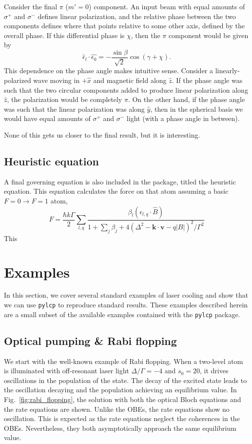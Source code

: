 \documentclass[final,5p,times,twocolumn]{elsarticle}
\begin{document}
Consider the final $\pi$ ($m'=0$) component.  An input beam with equal amounts
of $\sigma^+$ and $\sigma^-$  defines linear polarization, and the relative
phase between the two components defines where that points relative to some
other axis, defined by the overall  phase.  If this differential phase is
$\chi$, then the $\pi$ component would be given by
\begin{equation}
  \hat{\epsilon}_l\cdot\hat{\epsilon_0} = -\frac{\sin\beta}{\sqrt{2}}
  \cos(\gamma+\chi).
\end{equation}
This dependence on the phase angle makes intuitive sense.  Consider a
linearly-polarized wave moving in $+\hat{x}$ and magnetic field along $\hat{z}$.
If the phase angle was such that the two circular components added to produce
linear polarization along $\hat{z}$, the polarization would be completely $\pi$.
On the other hand, if the phase angle was such that the linear polarization was
along $\hat{y}$, then in the spherical basis we would have equal amounts of
$\sigma^+$ and $\sigma^-$ light (with a phase angle in between).

None of this gets us closer to the final result, but it is interesting.

\subsection{Heuristic equation}
A final governing equation is also included in the package, titled the heuristic equation.  This equation calculates the force on that atom assuming a basic $F=0\rightarrow F=1$ atom,
\begin{equation}
	F = \frac{\hbar k \Gamma}{2}\sum_{l,q} \frac{\beta_l \left(\epsilon_{l,q}\cdot \hat{B}\right)}{1+\sum_j\beta_j+4(\Delta^2 - \mathbf{k}\cdot\mathbf{v} - q |B|)^2/\Gamma^2} 
\end{equation}
This

\section{Examples}
In this section, we cover several standard examples of laser cooling and show that we can use {\tt pylcp} to reproduce standard results.  These examples described herein are a small subset of the available examples contained with the {\tt pylcp} package.

\subsection{Optical pumping \& Rabi flopping}
We start with the well-known example of Rabi flopping.  When a two-level atom is illuminated with off-resonant laser light $\Delta/\Gamma=-4$ and $s_0 = 20$, it drives oscillations in the population of the state.  The decay of the excited state leads to the oscillation decaying and the population achieving an equilibrium value.  In Fig.~\ref{fig:rabi_flopping}, the solution with both the optical Bloch equations and the rate equations are shown.  Unlike the OBEs, the rate equations show no oscillation.  This is expected as the rate equations neglect the coherences in the OBEs.  Nevertheless, they both asymptotically approach the same equilibrium value.
\end{document}
